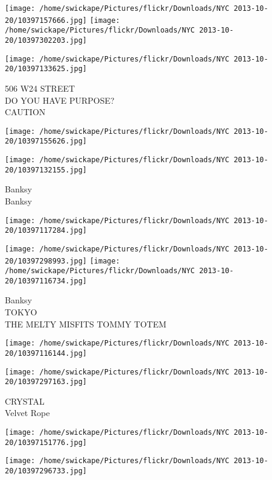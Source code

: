 \documentclass[10pt,letterpaper]{article}
\begin{document}
\texttt{[image: /home/swickape/Pictures/flickr/Downloads/NYC 2013-10-20/10397157666.jpg]}
\texttt{[image: /home/swickape/Pictures/flickr/Downloads/NYC 2013-10-20/10397302203.jpg]}

\texttt{[image: /home/swickape/Pictures/flickr/Downloads/NYC 2013-10-20/10397133625.jpg]}

506 W24 STREET\\
DO YOU HAVE PURPOSE?\\
CAUTION\\
\pagebreak

\texttt{[image: /home/swickape/Pictures/flickr/Downloads/NYC 2013-10-20/10397155626.jpg]}

\vspace{0.25in}
\texttt{[image: /home/swickape/Pictures/flickr/Downloads/NYC 2013-10-20/10397132155.jpg]}

Banksy\\
Banksy\\
\pagebreak

\texttt{[image: /home/swickape/Pictures/flickr/Downloads/NYC 2013-10-20/10397117284.jpg]}

\vspace{0.25in}
\texttt{[image: /home/swickape/Pictures/flickr/Downloads/NYC 2013-10-20/10397298993.jpg]}
\texttt{[image: /home/swickape/Pictures/flickr/Downloads/NYC 2013-10-20/10397116734.jpg]}

Banksy\\
TOKYO\\
THE MELTY MISFITS TOMMY TOTEM\\
\pagebreak

\texttt{[image: /home/swickape/Pictures/flickr/Downloads/NYC 2013-10-20/10397116144.jpg]}

\vspace{0.25in}
\texttt{[image: /home/swickape/Pictures/flickr/Downloads/NYC 2013-10-20/10397297163.jpg]}

CRYSTAL\\
Velvet Rope\\
\pagebreak

\texttt{[image: /home/swickape/Pictures/flickr/Downloads/NYC 2013-10-20/10397151776.jpg]}

\vspace{0.25in}
\texttt{[image: /home/swickape/Pictures/flickr/Downloads/NYC 2013-10-20/10397296733.jpg]}
\end{document}
